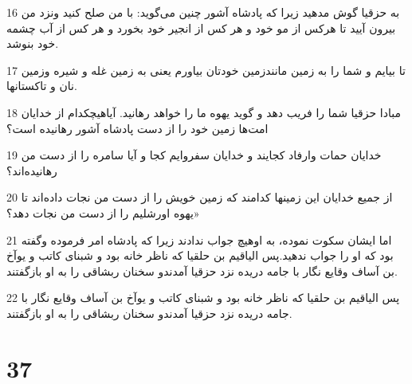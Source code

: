 \par 16 به حزقیا گوش مدهید زیرا که پادشاه آشور چنین می‌گوید: با من صلح کنید ونزد من بیرون آیید تا هرکس از مو خود و هر کس از انجیر خود بخورد و هر کس از آب چشمه خود بنوشد.
\par 17 تا بیایم و شما را به زمین مانندزمین خودتان بیاورم یعنی به زمین غله و شیره وزمین نان و تاکستانها.
\par 18 مبادا حزقیا شما را فریب دهد و گوید یهوه ما را خواهد رهانید. آیاهیچکدام از خدایان امت‌ها زمین خود را از دست پادشاه آشور رهانیده است؟
\par 19 خدایان حمات وارفاد کجایند و خدایان سفروایم کجا و آیا سامره را از دست من رهانیده‌اند؟
\par 20 از جمیع خدایان این زمینها کدامند که زمین خویش را از دست من نجات داده‌اند تا یهوه اورشلیم را از دست من نجات دهد؟»
\par 21 اما ایشان سکوت نموده، به اوهیچ جواب ندادند زیرا که پادشاه امر فرموده وگفته بود که او را جواب ندهید.پس الیاقیم بن حلقیا که ناظر خانه بود و شبنای کاتب و یوآخ بن آساف وقایع نگار با جامه دریده نزد حزقیا آمدندو سخنان ربشاقی را به او باز‌گفتند.
\par 22 پس الیاقیم بن حلقیا که ناظر خانه بود و شبنای کاتب و یوآخ بن آساف وقایع نگار با جامه دریده نزد حزقیا آمدندو سخنان ربشاقی را به او باز‌گفتند.
 
\chapter{37}

